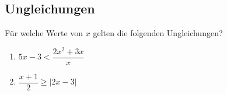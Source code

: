 \documentclass[11pt, a4paper]{article}
\newcommand\braces[1]{\left(#1\right)}
\newcommand\brackets[1]{\left[#1\right]}
\newcommand{\abs}[1]{\left\lvert#1\right\rvert}
\newif\ifshowsolution
\begin{document}
\subsection{Ungleichungen}
Für welche Werte von $x$ gelten die folgenden Ungleichungen?
\begin{enumerate}
	\item $5x-3 < \dfrac{2x^2+3x}{x}$
	
	\ifshowsolution
		\begin{align*}
			5x-3 &< 2x+3 \\
			3x &< 6 \\
			x &< 2
		\end{align*}
	\fi
	
	\item $\dfrac{x+1}{2} \geq \abs{2x-3}$
	
	\ifshowsolution
		\begin{align*}
			\dfrac{x+1}{2} &\geq 2 \abs{x-\frac{3}{2}}
			\shortintertext{Fall 1: $x \in \braces{-\infty, \frac{3}{2}}$}
			\dfrac{x+1}{2} &\geq 2 (-1) \braces{x-\frac{3}{2}} \\
			\dfrac{x+1}{2} &\geq 2 \braces{\frac{3}{2} - x} \\
			\dfrac{x+1}{2} &\geq 3 - 2x \\
			x+1 &\geq 6 - 4x \\
			5x &\geq 5 \\
			x &\geq 1
			\intertext{Also Lösung im Fall 1: $x \in \braces{-\infty, \frac{3}{2}} \cap \left[1,+\infty\right) = \left[ 1, \frac{3}{2} \right)$}
			\shortintertext{Fall 2: $x \in \left[ \frac{3}{2}, +\infty \right)$}
			\dfrac{x+1}{2} &\geq 2 \braces{x-\frac{3}{2}} \\
			x+1 &\geq 4x - 6 \\
			7 &\geq 3x \\
			\frac{7}{3} &\geq x
			\intertext{Also Lösung im Fall 2: $x \in \left[ \frac{3}{2}, +\infty \right) \cap \left( -\infty, \frac{7}{3} \right] = \brackets{\frac{3}{2}, \frac{7}{3} }$}
		\end{align*}
		Das Gesammtergebnis ergibt sich also aus $\left[ 1, \frac{3}{2} \right) \cup \brackets{\frac{3}{2}, \frac{7}{3}} = \brackets{1, \frac{7}{3}}$
	\fi
	

\end{enumerate}
\end{document}
